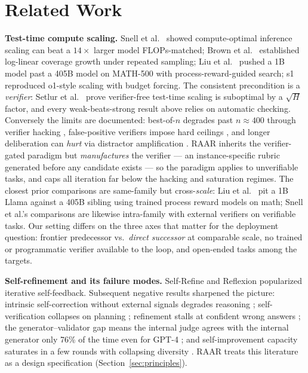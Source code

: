 \documentclass[journal]{IEEEtran}
\newcommand{\method}{RAAR}
\begin{document}
\section{Related Work}
\textbf{Test-time compute scaling.} Snell et al.~\cite{snell2024} showed
compute-optimal inference scaling can beat a $14\times$ larger model
FLOPs-matched; Brown et al.~\cite{brown2024} established log-linear coverage
growth under repeated sampling; Liu et al.~\cite{liu2025} pushed a 1B model
past a 405B model on MATH-500 with process-reward-guided search; s1
\cite{s1_2025} reproduced o1-style scaling with budget forcing. The
consistent precondition is a \emph{verifier}: Setlur et
al.~\cite{setlur2025} prove verifier-free test-time scaling is suboptimal by
a $\sqrt{H}$ factor, and every weak-beats-strong result above relies on
automatic checking. Conversely the limits are documented: best-of-$n$
degrades past $n\!\approx\!400$ through verifier hacking \cite{cobbe2021},
false-positive verifiers impose hard ceilings \cite{stroebl2024}, and longer
deliberation can \emph{hurt} via distractor amplification
\cite{gema2025}. \method{} inherits the verifier-gated paradigm but
\emph{manufactures} the verifier --- an instance-specific rubric generated
before any candidate exists --- so the paradigm applies to unverifiable
tasks, and caps all iteration far below the hacking and saturation regimes.
The closest prior comparisons are same-family but cross-\emph{scale}:
Liu et al.~\cite{liu2025} pit a 1B Llama against a 405B sibling using
trained process reward models on math; Snell et al.'s comparisons are
likewise intra-family with external verifiers on verifiable tasks. Our
setting differs on the three axes that matter for the deployment question:
frontier predecessor vs.\ \emph{direct successor} at comparable scale, no
trained or programmatic verifier available to the loop, and open-ended
tasks among the targets.

\textbf{Self-refinement and its failure modes.} Self-Refine
\cite{madaan2023} and Reflexion \cite{shinn2023} popularized
iterative self-feedback. Subsequent negative results sharpened the picture:
intrinsic self-correction without external signals degrades reasoning
\cite{huang2023}; self-verification collapses on planning
\cite{stechly2024}; refinement stalls at confident wrong answers
\cite{liang2023}; the generator--validator gap means the internal judge
agrees with the internal generator only 76\% of the time even for GPT-4
\cite{li2023gv}; and self-improvement capacity saturates in a few rounds
with collapsing diversity \cite{song2024, huang2024sharpening}. \method{}
treats this literature as a design specification (Section~\ref{sec:principles}).
\end{document}
